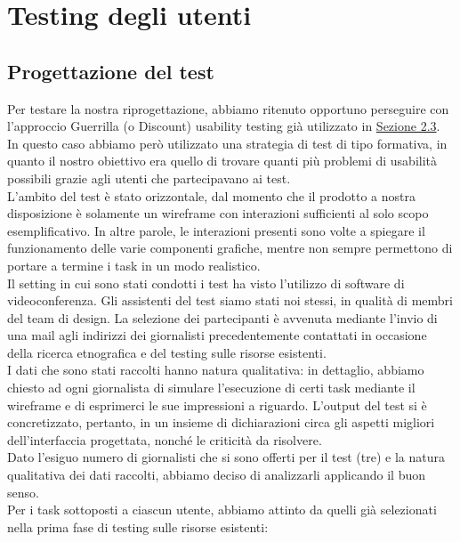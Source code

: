\section{Testing degli utenti}
\label{s:testing-utenti}

\subsection{Progettazione del test}
\label{ss:vd-progettazione-test}
Per testare la nostra riprogettazione, abbiamo ritenuto opportuno perseguire con l'approccio Guerrilla (o Discount) usability testing già utilizzato in \hyperref[s:verifica-risorse-esistenti-testing-utenti]{Sezione 2.3}.\\
In questo caso abbiamo però utilizzato una strategia di test di tipo formativa, in quanto il nostro obiettivo era quello di trovare quanti più problemi di usabilità possibili grazie agli utenti che partecipavano ai test.\\
L'ambito del test è stato orizzontale, dal momento che il prodotto a nostra disposizione è solamente un wireframe con interazioni sufficienti al solo scopo esemplificativo. In altre parole, le interazioni presenti sono volte a spiegare il funzionamento delle varie componenti grafiche, mentre non sempre permettono di portare a termine i task in un modo realistico.\\
Il setting in cui sono stati condotti i test ha visto l'utilizzo di software di videoconferenza. Gli assistenti del test siamo stati noi stessi, in qualità di membri del team di design. La selezione dei partecipanti è avvenuta mediante l'invio di una mail agli indirizzi dei giornalisti precedentemente contattati in occasione della ricerca etnografica e del testing sulle risorse esistenti.\\
I dati che sono stati raccolti hanno natura qualitativa: in dettaglio, abbiamo chiesto ad ogni giornalista di simulare l'esecuzione di certi task mediante il wireframe e di esprimerci le sue impressioni a riguardo. L'output del test si è concretizzato, pertanto, in un insieme di dichiarazioni circa gli aspetti migliori dell'interfaccia progettata, nonché le criticità da risolvere.\\
Dato l'esiguo numero di giornalisti che si sono offerti per il test (tre) e la natura qualitativa dei dati raccolti, abbiamo deciso di analizzarli applicando il buon senso.\\
Per i task sottoposti a ciascun utente, abbiamo attinto da quelli già selezionati nella prima fase di testing sulle risorse esistenti:
